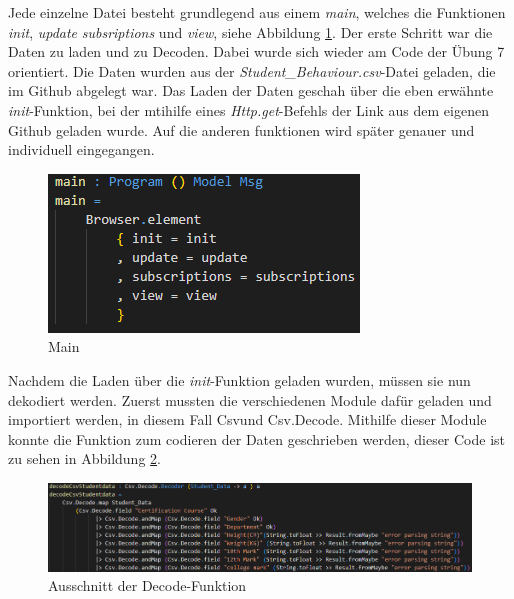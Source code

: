 \documentclass[usegeometry=true]{scrartcl}
\begin{document}
\noindent Jede einzelne Datei besteht grundlegend aus einem \textit{main}, welches die Funktionen \textit{init}, \textit{update} \textit{subsriptions} und \textit{view}, siehe Abbildung \ref{Main}.
Der erste Schritt war die Daten zu laden und zu Decoden. Dabei wurde sich wieder am Code der Übung 7 orientiert. Die Daten wurden aus der \textit{Student\_Behaviour.csv}-Datei geladen, die im Github abgelegt war. Das Laden der Daten geschah über die eben erwähnte \textit{init}-Funktion, bei der mtihilfe eines \textit{Http.get}-Befehls der Link aus dem eigenen Github geladen wurde. Auf die anderen funktionen wird später genauer und individuell eingegangen.







\begin{figure}[h]
\begin{center}
	\includegraphics[scale=.75]{Main.png}
	\caption{Main}
	\label{Main}
\end{center}
\end{figure}


\noindent Nachdem die Laden über die \textit{init}-Funktion geladen wurden, müssen sie nun dekodiert werden.
Zuerst mussten die verschiedenen Module dafür geladen und importiert werden, in diesem Fall \glqq Csv\grqq und \glqq Csv.Decode\grqq. %
Mithilfe dieser Module konnte die Funktion zum codieren der Daten geschrieben werden, dieser Code ist zu sehen in Abbildung \ref{Decode}.\\


\begin{figure}[h]
\begin{center}
	\includegraphics[scale=.5]{decode.png}
	\caption{Ausschnitt der Decode-Funktion}
	\label{Decode}
\end{center}
\end{figure}
\end{document}
